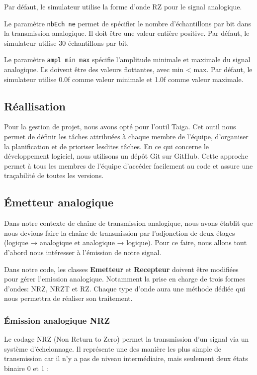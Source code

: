 Par défaut, le simulateur utilise la forme d'onde RZ pour le signal analogique.

Le paramètre \texttt{nbEch ne} permet de spécifier le nombre d'échantillons par bit dans la transmission analogique. Il doit être une valeur entière positive. Par défaut, le simulateur utilise 30 échantillons par bit.

Le paramètre \texttt{ampl min max} spécifie l'amplitude minimale et maximale du signal analogique. Ils doivent être des valeurs flottantes, avec min < max. Par défaut, le simulateur utilise 0.0f comme valeur minimale et 1.0f comme valeur maximale.

\subsection{Réallisation}
Pour la gestion de projet, nous avons opté pour l'outil Taiga. Cet outil nous permet de définir les tâches attribuées à chaque membre de l'équipe, d'organiser la planification et de prioriser lesdites tâches. En ce qui concerne le développement logiciel, nous utilisons un dépôt Git sur GitHub. Cette approche permet à tous les membres de l'équipe d'accéder facilement au code et assure une traçabilité de toutes les versions.

\subsection{Émetteur analogique}
Dans notre contexte de chaîne de transmission analogique, nous avons établit que nous devions faire la chaîne de transmission par l’adjonction de deux étages (logique → analogique et analogique → logique). Pour ce faire, nous allons tout d’abord nous intéresser à l’émission de notre signal. 

Dans notre code, les classes \textbf{Emetteur} et \textbf{Recepteur} doivent être modifiées pour gérer l’emission analogique. Notamment la prise en charge de trois formes d’ondes: NRZ, NRZT et RZ. Chaque type d’onde aura une méthode dédiée qui nous permettra de réaliser son traitement.

\subsubsection{Émission analogique NRZ}
Le codage NRZ (Non Return to Zero) permet la transmission d’un signal via un système d’échelonnage. Il représente une des manière les plus simple de transmission car il n’y a pas de niveau intermédiaire, mais seulement deux états binaire 0 et 1 :


